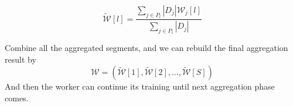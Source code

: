  \begin{equation}
 \label{eq:seg_agg}
     \widetilde{\mathcal{W}}[l] = \frac{\sum_{j\in P_l}|D_j|\mathcal{W}_j[l]}{\sum_{j\in P_l}|D_j|}
 \end{equation}

Combine all the aggregated segments, and we can rebuild the final aggregation result by 
\begin{equation}
    \mathcal{W} = (\widetilde{\mathcal{W}}[1],\widetilde{\mathcal{W}}[2],\dots,\widetilde{\mathcal{W}}[S])
\end{equation}
And then the worker can continue its training until next aggregation phase comes.
